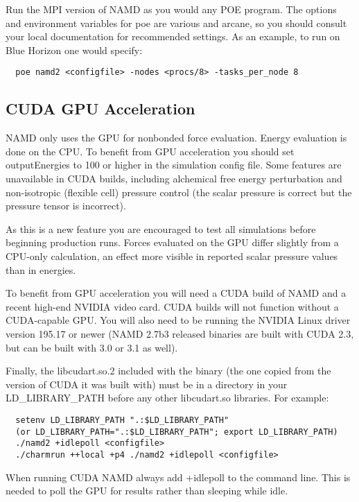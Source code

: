Run the MPI version of NAMD as you would any POE program.  The options
and environment variables for poe are various and arcane, so you should
consult your local documentation for recommended settings.  As an
example, to run on Blue Horizon one would specify:

\begin{verbatim}
  poe namd2 <configfile> -nodes <procs/8> -tasks_per_node 8
\end{verbatim}

\subsection{CUDA GPU Acceleration}

NAMD only uses the GPU for nonbonded force evaluation.  Energy evaluation
is done on the CPU.  To benefit from GPU acceleration you should set
outputEnergies to 100 or higher in the simulation config file.  Some
features are unavailable in CUDA builds, including alchemical free
energy perturbation and non-isotropic (flexible cell) pressure control
(the scalar pressure is correct but the pressure tensor is incorrect).

As this is a new feature you are encouraged to test all simulations
before beginning production runs.  Forces evaluated on the GPU differ
slightly from a CPU-only calculation, an effect more visible in reported
scalar pressure values than in energies.

To benefit from GPU acceleration you will need a CUDA build of NAMD
and a recent high-end NVIDIA video card.  CUDA builds will not function
without a CUDA-capable GPU.  You will also need to be running the
NVIDIA Linux driver version 195.17 or newer (NAMD 2.7b3 released binaries
are built with CUDA 2.3, but can be built with 3.0 or 3.1 as well).

Finally, the libcudart.so.2 included with the binary (the one copied from
the version of CUDA it was built with) must be in a directory in your
LD\_LIBRARY\_PATH before any other libcudart.so libraries.  For example:

\begin{verbatim}
  setenv LD_LIBRARY_PATH ".:$LD_LIBRARY_PATH"
  (or LD_LIBRARY_PATH=".:$LD_LIBRARY_PATH"; export LD_LIBRARY_PATH)
  ./namd2 +idlepoll <configfile>
  ./charmrun ++local +p4 ./namd2 +idlepoll <configfile>
\end{verbatim}

When running CUDA NAMD always add +idlepoll to the command line.  This
is needed to poll the GPU for results rather than sleeping while idle.

